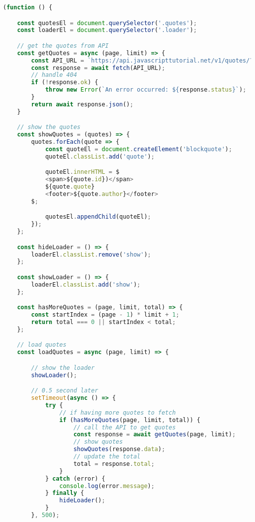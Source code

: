 \documentclass[11pt]{article}
\begin{document}
\begin{lstlisting}[language=JavaScript]
(function () {

    const quotesEl = document.querySelector('.quotes');
    const loaderEl = document.querySelector('.loader');

    // get the quotes from API
    const getQuotes = async (page, limit) => {
        const API_URL = `https://api.javascripttutorial.net/v1/quotes/?page=${page}&limit=${limit}`;
        const response = await fetch(API_URL);
        // handle 404
        if (!response.ok) {
            throw new Error(`An error occurred: ${response.status}`);
        }
        return await response.json();
    }

    // show the quotes
    const showQuotes = (quotes) => {
        quotes.forEach(quote => {
            const quoteEl = document.createElement('blockquote');
            quoteEl.classList.add('quote');

            quoteEl.innerHTML = $
            <span>${quote.id})</span>
            ${quote.quote}
            <footer>${quote.author}</footer>
        $;

            quotesEl.appendChild(quoteEl);
        });
    };

    const hideLoader = () => {
        loaderEl.classList.remove('show');
    };

    const showLoader = () => {
        loaderEl.classList.add('show');
    };

    const hasMoreQuotes = (page, limit, total) => {
        const startIndex = (page - 1) * limit + 1;
        return total === 0 || startIndex < total;
    };

    // load quotes
    const loadQuotes = async (page, limit) => {

        // show the loader
        showLoader();

        // 0.5 second later
        setTimeout(async () => {
            try {
                // if having more quotes to fetch
                if (hasMoreQuotes(page, limit, total)) {
                    // call the API to get quotes
                    const response = await getQuotes(page, limit);
                    // show quotes
                    showQuotes(response.data);
                    // update the total
                    total = response.total;
                }
            } catch (error) {
                console.log(error.message);
            } finally {
                hideLoader();
            }
        }, 500);


\end{lstlisting}
\end{document}
